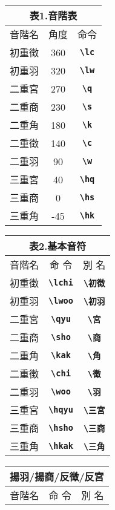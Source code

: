 \documentclass[a4paper,luatex]{l3doc}
\begin{document}
\begin{description}
\begin{tabular}[t]{|c|c|c|}
\multicolumn{3}{c}{表1.{\bf 音階表}}\\\hline
 音階名&角度 &命令 \\\hline\hline
 初重徴&360 &{\bf \verb|\lc|} \\\hline
 初重羽&320 &{\bf \verb|\lw|} \\\hline
 二重宮&270 &{\bf \verb|\q|} \\\hline
 二重商&230 &{\bf \verb|\s|} \\\hline
 二重角&180 &{\bf \verb|\k|} \\\hline
 二重徴&140 &{\bf \verb|\c|} \\\hline
 二重羽&90 &{\bf \verb|\w|} \\\hline
 三重宮&40 &{\bf \verb|\hq|} \\\hline
 三重商&0 &{\bf \verb|\hs|} \\\hline
 三重角&-45 &{\bf \verb|\hk|} \\\hline
\end{tabular}
\ifluatex \hspace{2\zw}
\else \hspace{2zw}
\fi
\begin{tabular}[t]{|c|c|c|}
\multicolumn{3}{c}{表2.{\bf 基本音符}}\\\hline
音階名&命 令&別 名\\\hline\hline
初重徴 & {\bf \verb|\lchi|} & {\bf \verb|\初徴|} \\\hline
初重羽&{\bf \verb|\lwoo|}&{\bf \verb|\初羽|} \\\hline
二重宮&{\bf \verb|\qyu|}&{\bf \verb|\宮|} \\\hline
二重商&{\bf \verb|\sho|}&{\bf \verb|\商|} \\\hline
二重角&{\bf \verb|\kak|}&{\bf \verb|\角|} \\\hline
二重徴&{\bf \verb|\chi|}&{\bf \verb|\徴|} \\\hline
二重羽&{\bf \verb|\woo|}&{\bf \verb|\羽|} \\\hline
三重宮&{\bf \verb|\hqyu|}&{\bf \verb|\三宮|} \\\hline
三重商&{\bf \verb|\hsho|}&{\bf \verb|\三商|} \\\hline
三重角&{\bf \verb|\hkak|}&{\bf \verb|\三角|}\\\hline
\end{tabular} 
\begin{tabular}[t]{|c|c|c|}
\multicolumn{3}{c}{揚羽/揚商/反徴/反宮}\\\hline
音階名&命 令&別 名\\\hline\hline

\end{tabular}
\end{description}
\end{document}
